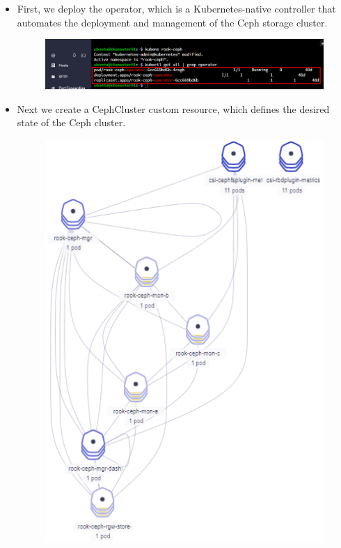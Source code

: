 \begin{itemize}[label={--}]
    \item First, we deploy the operator, which is a Kubernetes-native controller that automates the deployment and management of the Ceph storage cluster. 
    \begin{figure}[H]\centering
    \includegraphics[width=1.0\textwidth,angle=00]{assets/f27.png}
    \end{figure}
    \item Next we create a CephCluster custom resource, which defines the desired state of the Ceph cluster.
    \begin{figure}[H]\centering
    \includegraphics[width=1.0\textwidth,angle=00]{assets/f28.png}
    \end{figure}
    \end{itemize}
